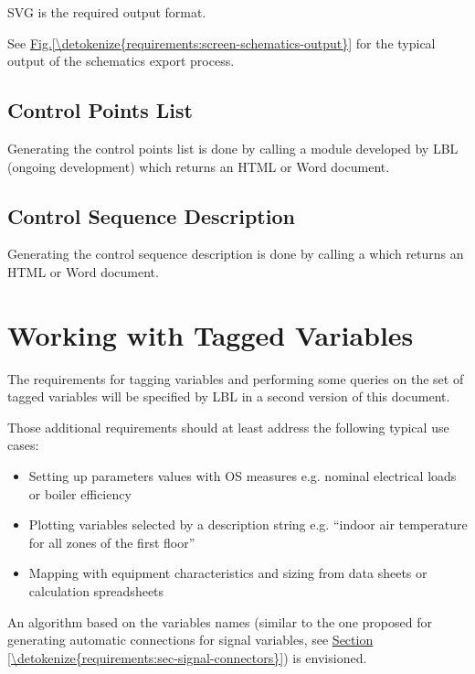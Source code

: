 \documentclass[letterpaper,10pt, openany,english]{sphinxmanual}
\begin{document}
SVG is the required output format.

See \hyperref[\detokenize{requirements:screen-schematics-output}]{Fig.\@ \ref{\detokenize{requirements:screen-schematics-output}}} for the typical output of the schematics export process.


\subsection{Control Points List}
\label{\detokenize{requirements:control-points-list}}
Generating the control points list is done by calling a module developed by LBL (ongoing development) which returns an HTML or Word document.


\subsection{Control Sequence Description}
\label{\detokenize{requirements:control-sequence-description}}
Generating the control sequence description is done by calling a  which returns an HTML or Word document.


\section{Working with Tagged Variables}
\label{\detokenize{requirements:working-with-tagged-variables}}\label{\detokenize{requirements:sec-tagged-variables}}
The requirements for tagging variables and performing some queries on the set of tagged variables will be specified by LBL in a second version of this document.

Those additional requirements should at least address the following typical use cases:
\begin{itemize}
\item {} 
Setting up parameters values with OS measures e.g. nominal electrical loads or boiler efficiency

\item {} 
Plotting variables selected by a description string e.g. “indoor air temperature for all zones of the first floor”

\item {} 
Mapping with equipment characteristics and sizing from data sheets or calculation spreadsheets

\end{itemize}

An algorithm based on the variables names (similar to the one proposed for generating automatic connections for signal variables, see \hyperref[\detokenize{requirements:sec-signal-connectors}]{Section \ref{\detokenize{requirements:sec-signal-connectors}}}) is envisioned.
\end{document}
